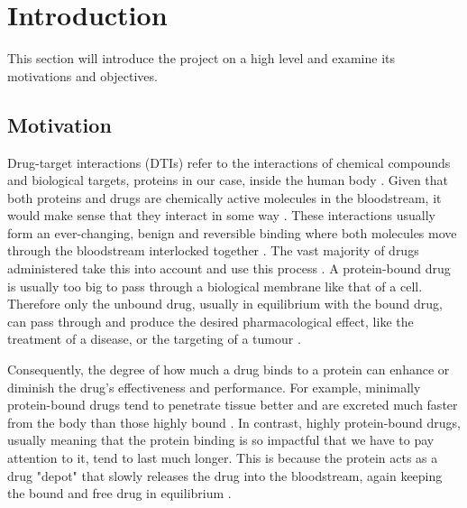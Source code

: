 \section{Introduction}
\label{sec:Introduction}

This section will introduce the project on a high level and examine its motivations and objectives.

\subsection{Motivation}
\label{subsec:Motivation}

Drug-target interactions (DTIs) refer to the interactions of chemical compounds and biological targets, proteins in our case, inside the human body \citep{Sachdev2019}. Given that both proteins and drugs are chemically active molecules in the bloodstream, it would make sense that they interact in some way \citep{DerangedPhysiology}. These interactions usually form an ever-changing, benign and reversible binding where both molecules move through the bloodstream interlocked together \citep{DerangedPhysiology}. The vast majority of drugs administered take this into account and use this process \citep{DerangedPhysiology}. A protein-bound drug is usually too big to pass through a biological membrane like that of a cell. Therefore only the unbound drug, usually in equilibrium with the bound drug, can pass through and produce the desired pharmacological effect, like the treatment of a disease, or the targeting of a tumour \citep{ProteinBindingOverview}. 

Consequently, the degree of how much a drug binds to a protein can enhance or diminish the drug's effectiveness and performance. For example, minimally protein-bound drugs tend to penetrate tissue better and are excreted much faster from the body than those highly bound \citep{Scheife1989}. In contrast, highly protein-bound drugs, usually meaning that the protein binding is so impactful that we have to pay attention to it, tend to last much longer. This is because the protein acts as a drug "depot" that slowly releases the drug into the bloodstream, again keeping the bound and free drug in equilibrium \citep{DerangedPhysiology, ProteinBindingOverview}.

